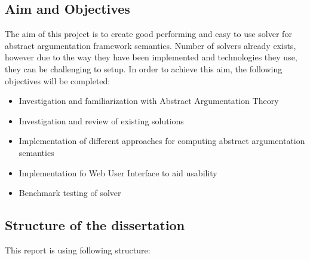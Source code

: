 \subsection{Aim and Objectives}
The aim of this project is to create good performing and easy to use solver for abstract argumentation framework semantics. Number of solvers already exists, however due to the way they have been implemented and technologies they use, they can be challenging to setup. In order to achieve this aim, the following objectives will be completed:
\begin{itemize}
	\item Investigation and familiarization with Abstract Argumentation Theory
	\item Investigation and review of existing solutions
	\item Implementation of different approaches for computing abstract argumentation semantics
	\item Implementation fo Web User Interface to aid usability
	\item Benchmark testing of solver
\end{itemize}

\subsection{Structure of the dissertation}
This report is using following structure:

